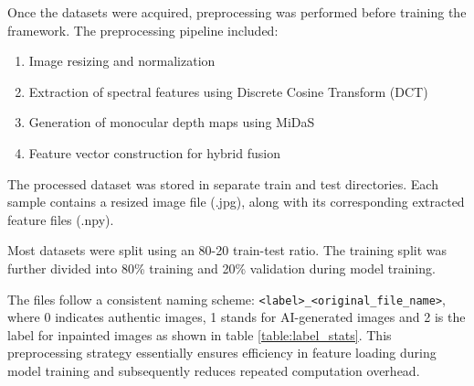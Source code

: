 Once the datasets were acquired, preprocessing was performed before training the
framework. The preprocessing pipeline included:
\begin{enumerate}
  \item{Image resizing and normalization}
  \item{Extraction of spectral features using Discrete Cosine Transform (DCT)}
  \item{Generation of monocular depth maps using MiDaS}
  \item{Feature vector construction for hybrid fusion}
\end{enumerate}

The processed dataset was stored in separate train and test directories. Each
sample contains a resized image file (.jpg), along with its corresponding
extracted feature files (.npy).

Most datasets were split using an 80-20 train-test ratio. The training split was
further divided into 80\% training and 20\% validation during model training.



The files follow a consistent naming scheme:
\verb|<label>_<original_file_name>|, where 0 indicates authentic images, 1
stands for AI-generated images and 2 is the label for inpainted images as shown
in table \ref{table:label_stats}. This preprocessing strategy essentially
ensures efficiency in feature loading during model training and subsequently
reduces repeated computation overhead.
